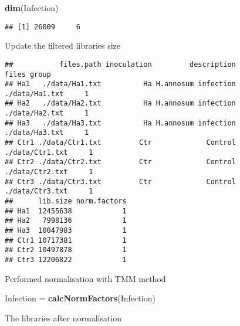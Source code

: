 \documentclass[
]{article}
\newenvironment{Shaded}{\begin{snugshade}}{\end{snugshade}}
\newcommand{\FunctionTok}[1]{\textcolor[rgb]{0.13,0.29,0.53}{\textbf{#1}}}
\newcommand{\NormalTok}[1]{#1}
\newcommand{\OtherTok}[1]{\textcolor[rgb]{0.56,0.35,0.01}{#1}}
\newcommand{\SpecialCharTok}[1]{\textcolor[rgb]{0.81,0.36,0.00}{\textbf{#1}}}
\begin{document}
\begin{Shaded}
\begin{Highlighting}[]
\FunctionTok{dim}\NormalTok{(Infection)}
\end{Highlighting}
\end{Shaded}

\begin{verbatim}
## [1] 26009     6
\end{verbatim}

Update the filtered libraries size

\begin{Shaded}
\end{Shaded}

\begin{verbatim}
##           files.path inoculation         description           files group
## Ha1   ./data/Ha1.txt          Ha H.annosum infection  ./data/Ha1.txt     1
## Ha2   ./data/Ha2.txt          Ha H.annosum infection  ./data/Ha2.txt     1
## Ha3   ./data/Ha3.txt          Ha H.annosum infection  ./data/Ha3.txt     1
## Ctr1 ./data/Ctr1.txt         Ctr             Control ./data/Ctr1.txt     1
## Ctr2 ./data/Ctr2.txt         Ctr             Control ./data/Ctr2.txt     1
## Ctr3 ./data/Ctr3.txt         Ctr             Control ./data/Ctr3.txt     1
##      lib.size norm.factors
## Ha1  12455638            1
## Ha2   7998136            1
## Ha3  10047983            1
## Ctr1 10717381            1
## Ctr2 10497878            1
## Ctr3 12206822            1
\end{verbatim}

Performed normalisation with TMM method

\begin{Shaded}
\begin{Highlighting}[]
\NormalTok{Infection }\OtherTok{=} \FunctionTok{calcNormFactors}\NormalTok{(Infection)}
\end{Highlighting}
\end{Shaded}

The libraries after normalisation

\begin{Shaded}
\end{Shaded}
\end{document}
